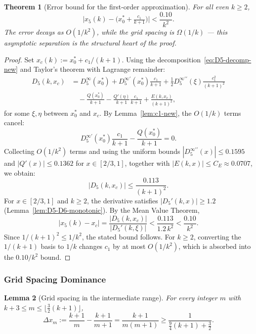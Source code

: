 \documentclass[12pt,a4paper]{article}
\theoremstyle{plain}
\newtheorem{theorem}{Theorem}[section]
\newtheorem{lemma}[theorem]{Lemma}
\theoremstyle{definition}
\begin{document}
\begin{theorem}[Error bound for the first-order approximation]
  \label{thm:error-bound-new}
  For all even $k \ge 2$,
  \begin{equation}\label{eq:error-bound-new}
    \bigl|x_5(k) - \bigl(x_0^* + \tfrac{c_1}{k+1}\bigr)\bigr|
    < \frac{0.10}{k^2}.
  \end{equation}
  The error decays as $O(1/k^2)$, while the grid spacing is $\Omega(1/k)$ ---
  this asymptotic separation is the structural heart of the proof.
\end{theorem}

\begin{proof}
  Set $x_c(k) := x_0^* + c_1/(k+1)$.  Using the decomposition~\eqref{eq:D5-decomp-new}
  and Taylor's theorem with Lagrange remainder:
  \begin{align*}
    D_5(k, x_c) &= D_5^\infty(x_0^*)
      + D_5^{\infty\prime}(x_0^*)\frac{c_1}{k+1}
      + \frac{1}{2}D_5^{\infty\prime\prime}(\xi)\frac{c_1^2}{(k+1)^2} \\
    &\quad - \frac{Q(x_0^*)}{k+1}
      - \frac{Q'(\eta)}{k+1}\frac{c_1}{k+1}
      + \frac{E(k,x_c)}{(k+1)^2},
  \end{align*}
  for some $\xi,\eta$ between $x_0^*$ and $x_c$.
  By Lemma~\ref{lem:c1-new}, the $O(1/k)$ terms cancel:
  \[
    D_5^{\infty\prime}(x_0^*)\frac{c_1}{k+1} - \frac{Q(x_0^*)}{k+1} = 0.
  \]
  Collecting $O(1/k^2)$ terms and using the uniform bounds
  $|D_5^{\infty\prime\prime}(x)| \le 0.1595$ and
  $|Q'(x)| \le 0.1362$ for $x \in [2/3,1]$, together with
  $|E(k,x)| \le C_E \approx 0.0707$, we obtain:
  \[
    |D_5(k, x_c)| \le \frac{0.113}{(k+1)^2}.
  \]
  For $x \in [2/3,1]$ and $k \ge 2$, the derivative satisfies
  $|D_5'(k,x)| \ge 1.2$ (Lemma~\ref{lem:D5-D6-monotonic}).
  By the Mean Value Theorem,
  \[
    |x_5(k) - x_c| = \frac{|D_5(k, x_c)|}{|D_5'(k,\xi)|}
    < \frac{0.113}{1.2\,k^2} < \frac{0.10}{k^2}.
  \]
  Since $1/(k+1)^2 \le 1/k^2$, the stated bound follows.
  For $k \ge 2$, converting the $1/(k+1)$ basis to $1/k$ changes $c_1$
  by at most $O(1/k^2)$, which is absorbed into the $0.10/k^2$ bound.
\end{proof}

\subsubsection{Grid Spacing Dominance}
\label{sec:grid-dom}

\begin{lemma}[Grid spacing in the intermediate range]\label{lem:grid-spacing-new}
  For every integer $m$ with $k+3 \le m \le \lfloor\frac{3}{2}(k+1)\rfloor$,
  \begin{equation}\label{eq:grid-spacing-new}
    \Delta x_m := \frac{k+1}{m} - \frac{k+1}{m+1}
    = \frac{k+1}{m(m+1)}
    \ge \frac{1}{\frac{9}{4}(k+1) + \frac{3}{2}}.
  \end{equation}
\end{lemma}
\end{document}
